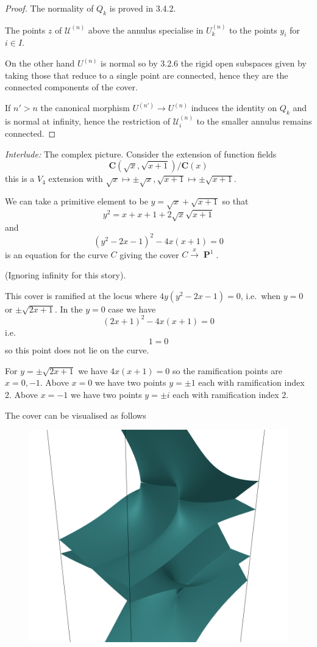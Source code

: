 \documentclass[oneside,12pt,]{article}
\DeclareMathOperator{\PP}{\mathbf{P}}
\newcommand{\gt}{>}
\newcommand{\CC}{\mathbf{C}}
\begin{document}
\begin{proof}
    The normality of $Q_k$ is proved in 3.4.2.

    The points $z$ of $\mathscr U^{(n)}$ above the annulus specialise in $U_k^{(n)}$ to the points $y_i$ for $i \in I$.

    On the other hand $U^{(n)}$ is normal so by 3.2.6 the rigid open subspaces given by taking those that reduce to a single point are connected, hence they are the connected components of the cover.

    If $n'\gt  n$ the canonical morphism $U^{(n')} \to U^{(n)}$ induces the identity on $Q_k$ and is normal at infinity, hence the restriction of $\mathscr U_i^{(n)}$ to the smaller annulus remains connected.
\end{proof}


\emph{Interlude:} The complex picture. Consider the extension of function fields
\[
    \CC ( \sqrt{ x} , \sqrt{x+1}) / \CC(x)
\]
this is a $V_4$ extension with $\sqrt x \mapsto \pm \sqrt x, \sqrt{x+1} \mapsto \pm \sqrt{x+1}$.

We can take a primitive element to be $y = \sqrt x + \sqrt {x+1}$ so that
\[
    y^2 = x + x + 1 + 2\sqrt{x}\sqrt{x+1}
\]
and
\[
    (y^2 - 2x - 1)^2 - 4 x(x+1) = 0
\]
is an equation for the curve $C$ giving the cover $C \xrightarrow{x} \PP^1$.

(Ignoring infinity for this story).

This cover is ramified at the locus where $4y(y^2 - 2x - 1) = 0$, i.e.\ when $y=0$ or $\pm \sqrt{2x+1}$.
In the $y=0$ case we have 
\[(2x + 1)^2 - 4 x(x+1) = 0\]
i.e.
\[1 = 0\]
so this point does not lie on the curve.

For $y = \pm \sqrt{2x+1}$ we have $4x(x+1)=0$ so the ramification points are $x=0,-1$.
Above $x=0$ we have two points $ y = \pm 1$ each with ramification index 2.
Above $x=-1$ we have two points $ y = \pm i$ each with ramification index 2.

The cover can be visualised as follows

\begin{figure}[H]
    \includegraphics[width=\textwidth]{ramcov.png}
\end{figure}
\end{document}
